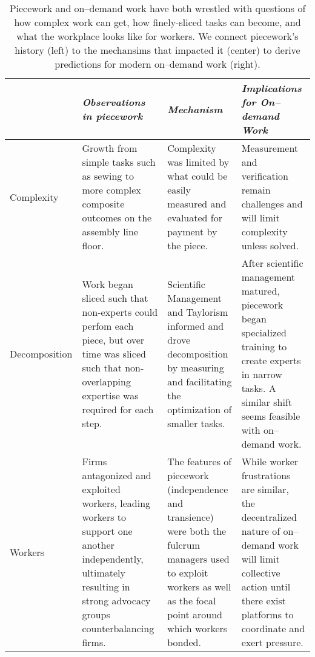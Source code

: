 \documentclass[trackingWork]{subfiles}
\begin{document}
\begin{table*}[t]
  \centering
  \begin{tabularx}{\textwidth}{l X X X}
    \toprule
    & \textit{Observations in piecework} & \textit{Mechanism} & \textit{Implications for On--demand Work} \\
    \midrule
    {Complexity} &
    \small{Growth from simple tasks such as sewing to more complex composite outcomes on the assembly line floor.} &
    \small{Complexity was limited by what could be easily measured and evaluated for payment by the piece.} &
    \small{Measurement and verification remain challenges and will limit complexity unless solved.} \\ \hline

    {Decomposition} &
    \small{Work began sliced such that non-experts could perfom each piece, but over time was sliced such that non-overlapping expertise was required for each step.} &
    \small{Scientific Management and Taylorism informed and drove decomposition by measuring and facilitating the optimization of smaller tasks.} &
    \small{After scientific management matured, piecework began  specialized training to create experts in narrow tasks. A similar shift seems feasible with on--demand work.} \\ \hline

    {Workers} &
    \small{Firms antagonized and exploited workers, leading workers to support one another independently, ultimately resulting in strong advocacy groups counterbalancing firms.} &
    \small{The features of piecework (independence and transience) were both the fulcrum managers used to exploit workers as well as the focal point around which workers bonded.} &
    \small{While worker frustrations are similar, the decentralized nature of on--demand work will limit collective action until there exist platforms to coordinate and exert pressure.} \\ 
    \bottomrule
  \end{tabularx}
  \caption{Piecework and on--demand work have both wrestled with questions of how complex work can get, how finely-sliced tasks can become, and what the workplace looks like for workers. We connect piecework's history (left) to the mechansims that impacted it (center) to derive predictions for modern on--demand work (right). }
\end{table*}
\end{document}
